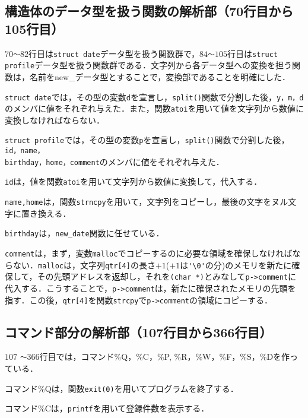 \documentclass[a4j,11pt]{jarticle}
\begin{document}
\subsection{構造体のデータ型を扱う関数の解析部（70行目から105行目）}
$70$\verb|～|$82$行目は\verb|struct date|データ型を扱う関数群で，$84$\verb|～|$105$行目は\verb|struct profile|データ型を扱う関数群である．文字列から各データ型への変換を担う関数は，名前をnew\_データ型とすることで，変換部であることを明確にした．

\verb|struct date|では，その型の変数\verb|d|を宣言し，\verb|split()|関数で分割した後，\verb|y，m，d|のメンバに値をそれぞれ与えた．また，関数\verb|atoi|を用いて値を文字列から数値に変換しなければならない．

\verb|struct profile|では，その型の変数\verb|p|を宣言し，\verb|split()|関数で分割した後，\verb|id，name，|\\\verb|birthday，home，comment|のメンバに値をそれぞれ与えた．

\verb|id|は，値を関数\verb|atoi|を用いて文字列から数値に変換して，代入する．

\verb|name,home|は，関数\verb|strncpy|を用いて，文字列をコピーし，最後の文字をヌル文字に置き換える．

\verb|birthday|は，\verb|new_date|関数に任せている．

\verb|comment|は，まず，変数\verb|malloc|でコピーするのに必要な領域を確保しなければならない．\verb|malloc|は，文字列\verb|qtr[4]|の長さ$+1$($+1$は\verb|'\0'|の分)のメモリを新たに確保して，その先頭アドレスを返却し，それを\verb|(char *)|とみなして\verb|p->comment|に代入する．こうすることで，\verb|p->comment|は，新たに確保されたメモリの先頭を指す．この後，\verb|qtr[4]|を関数\verb|strcpy|で\verb|p->comment|の領域にコピーする．

\subsection{コマンド部分の解析部（107行目から366行目）}
$107$ \verb|～|$366$行目では，コマンド\%Q，\%C，\%P, \%R，\%W，\%F，\%S，\%Dを作っている．

コマンド\%Qは，関数\verb|exit(0)|を用いてプログラムを終了する． 

コマンド\%Cは，\verb|printf|を用いて登録件数を表示する． 
\end{document}
